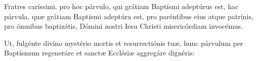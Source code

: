  Fratres caríssimi, pro
\ifparvulus
hoc párvulo, qui grátiam Baptísmi adeptúrus est,
\else
hac párvula, quæ grátiam Baptísmi adeptúra est,
\fi
pro paréntibus eius atque patrínis, pro ómnibus baptizátis,
Dómini nostri Iesu Christi mi\-se\-ri\-cór\-di\-am invocémus.

 Ut, fulgénte divíno mystério mortis et resurrectiónis tuæ,
hunc párvulum per Baptísmum regeneráre et sanctæ Ecclésiæ aggregáre
dignéris:

